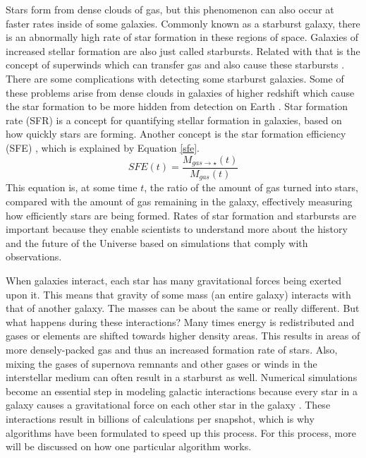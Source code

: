 \documentclass[11pt]{article} %
\begin{document}
	Stars form from dense clouds of gas, but this phenomenon can also occur at faster rates inside of some galaxies. Commonly known as a starburst galaxy, there is an abnormally high rate of star formation in these regions of space. Galaxies of increased stellar formation are also just called starbursts. Related with that is the concept of superwinds which can transfer gas and also cause these starbursts \cite{superwinds}. There are some complications with detecting some starburst galaxies. Some of these problems arise from dense clouds in galaxies of higher redshift which cause the star formation to be more hidden from detection on Earth \cite{starburst}.  Star formation rate (SFR) is a concept for quantifying stellar formation in galaxies, based on how quickly stars are forming. Another concept is the star formation efficiency (SFE) \cite{mergerstats}, which is explained by Equation \ref{sfe}.
  \begin{equation}
    \label{sfe}
    SFE(t) = \frac{M_{gas \to \star}(t)}{M_{gas}(t)}
  \end{equation}
This equation is, at some time $t$, the ratio of the amount of gas turned into stars, compared with the amount of gas remaining in the galaxy, effectively measuring how efficiently stars are being formed. Rates of star formation and starbursts are important because they enable scientists to understand more about the history and the future of the Universe based on simulations that comply with observations.

	When galaxies interact, each star has many gravitational forces being exerted upon it. This means that gravity of some mass (an entire galaxy) interacts with that of another galaxy. The masses can be about the same or really different. But what happens during these interactions? Many times energy is redistributed and gases or elements are shifted towards higher density areas. This results in areas of more densely-packed gas and thus an increased formation rate of stars. Also, mixing the gases of supernova remnants and other gases or winds in the interstellar medium can often result in a starburst as well. Numerical simulations become an essential step in modeling galactic interactions because every star in a galaxy causes a gravitational force on each other star in the galaxy \cite{mergers,mergerstats,LBG,superwinds}. These interactions result in billions of calculations per snapshot, which is why algorithms have been formulated to speed up this process. For this process, more will be discussed on how one particular algorithm works.
\end{document}
